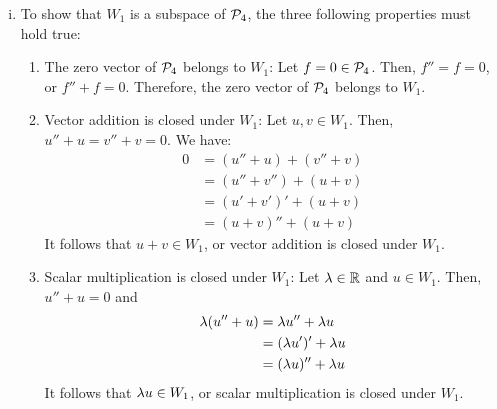 \begin{sol}
    \begin{enumerate}[(i)]
        \item To show that $W_1$ is a subspace of $\P_4$, the three following properties must hold true:
        \begin{enumerate}[(1)]
            \item The zero vector of $\P_4$ belongs to $W_1$: Let $f=0\in\P_4$. Then, $f''=f=0$, or $f''+f=0$. Therefore, the zero vector of $\P_4$ belongs to $W_1$.
            \item Vector addition is closed under $W_1$: Let $u,v\in W_1$. Then, $u''+u=v''+v=0$. We have:
            \[
                \begin{aligned}
                    0 & = (u''+u)+(v''+v) \\
                      & = (u''+v'')+(u+v) \\
                      & = (u'+v')'+(u+v)  \\
                      & = (u+v)''+(u+v)
                \end{aligned}
            \]
            It follows that $u+v\in W_1$, or vector addition is closed under $W_1$.
            \item Scalar multiplication is closed under $W_1$: Let $\lam\in\R$ and $u\in W_1$. Then, $u''+u=0$ and
            \[
                \begin{aligned}
                    \lam(u''+u) & = \lam u''+\lam u   \\
                                & = (\lam u')'+\lam u \\
                                & = (\lam u)''+\lam u
                \end{aligned}
            \]
            It follows that $\lam u\in W_1$, or scalar multiplication is closed under $W_1$.


\end{enumerate}
\end{enumerate}
\end{sol}

